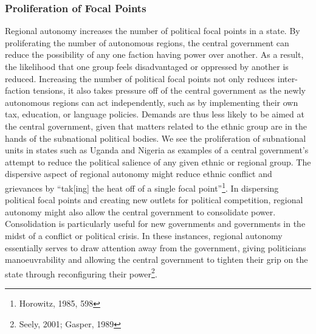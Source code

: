 \documentclass[12pt]{article}
\begin{document}
\subsubsection{Proliferation of Focal Points}
Regional autonomy increases the number of political focal points in a state. By proliferating the number of autonomous regions, the central government can reduce the possibility of any one faction having power over another. As a result, the likelihood that one group feels disadvantaged or oppressed by another is reduced. Increasing the number of political focal points not only reduces inter-faction tensions, it also takes pressure off of the central government as the newly autonomous regions can act independently, such as by implementing their own tax, education, or language policies. Demands are thus less likely to be aimed at the central government, given that matters related to the ethnic group are in the hands of the subnational political bodies. We see the proliferation of subnational units in states such as Uganda and Nigeria as examples of a central government’s attempt to reduce the political salience of any given ethnic or regional group. The dispersive aspect of regional autonomy might reduce ethnic conflict and grievances by “tak[ing] the heat off of a single focal point”\footnote{Horowitz, 1985, 598}. In dispersing political focal points and creating new outlets for political competition, regional autonomy might also allow the central government to consolidate power. Consolidation is particularly useful for new governments and governments in the midst of a conflict or political crisis. In these instances, regional autonomy essentially serves to draw attention away from the government, giving politicians manoeuvrability and allowing the central government to tighten their grip on the state through reconfiguring their power\footnote{Seely, 2001; Gasper, 1989}.
\end{document}
